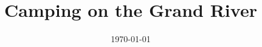 \documentclass{mcmthesis}
\title{Camping on the Grand River} %
\author{\small \href{http://www.latexstudio.net/}
  {\graphics[width=7cm]{mcmthesis-logo}}}
\date{\today}
\begin{document}
\restoregeometry %
\maketitle  %
\tableofcontents %
\newpage %


 
\end{document}
